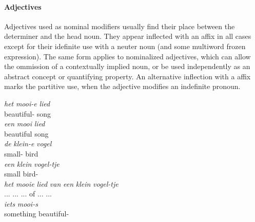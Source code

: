 \paragraph{Adjectives}
Adjectives used as nominal modifiers usually find their place between the determiner and the head noun.
They appear inflected with an  affix in all cases except for their idefinite use with a neuter noun (and some multiword frozen expression).
The same form applies to nominalized adjectives, which can allow the ommission of a contextually implied noun, or be used independently as an abstract concept or quantifying property.
An alternative inflection with a  affix marks the partitive use, when the adjective modifies an indefinite pronoun.


\begin{exe}
\ex
\gll \textit{het} \textit{mooi-e} \textit{lied}\\
 beautiful- song\\
\ex
\gll \textit{een} \textit{mooi} \textit{lied}\\
 beautiful song\\
\ex
\gll \textit{de} \textit{klein-e} \textit{vogel}\\
 small- bird\\
\ex
\gll \textit{een} \textit{klein} \textit{vogel-tje}\\
 small bird-\\
\ex
\gll \textit{het} \textit{mooie} \textit{lied} \textit{van} \textit{een} \textit{klein} \textit{vogel-tje}\\
... ... ... of ... ...\\
\ex
\gll \textit{iets} \textit{mooi-s}\\
something beautiful-\\
\end{exe}


